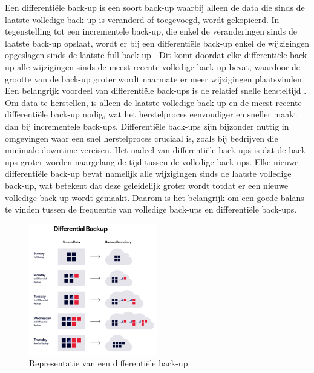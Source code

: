 Een differentiële back-up is een soort back-up waarbij alleen de data die sinds de laatste volledige back-up is veranderd of toegevoegd, wordt gekopieerd. In tegenstelling tot een incrementele back-up, die enkel de veranderingen sinds de laatste back-up opslaat, wordt er bij een differentiële back-up enkel de wijzigingen opgeslagen sinds de laatste full back-up . Dit komt doordat elke differentiële back-up alle wijzigingen sinds de meest recente volledige back-up bevat, waardoor de grootte van de back-up groter wordt naarmate er meer wijzigingen plaatsvinden. Een belangrijk voordeel van differentiële back-ups is de relatief snelle hersteltijd \autocite{Beard2018}. Om data te herstellen, is alleen de laatste volledige back-up en de meest recente differentiële back-up nodig, wat het herstelproces eenvoudiger en sneller maakt dan bij incrementele back-ups. Differentiële back-ups zijn bijzonder nuttig in omgevingen waar een snel herstelproces cruciaal is, zoals bij bedrijven die minimale downtime vereisen. Het nadeel van differentiële back-ups is dat de back-ups groter worden naargelang de tijd tussen de volledige back-ups. Elke nieuwe differentiële back-up bevat namelijk alle wijzigingen sinds de laatste volledige back-up, wat betekent dat deze geleidelijk groter wordt totdat er een nieuwe volledige back-up wordt gemaakt. Daarom is het belangrijk om een goede balans te vinden tussen de frequentie van volledige back-ups en differentiële back-ups.
 \begin{figure}[h]
     \centering
     \includegraphics[width=0.5\textwidth]{img/diff.png}  
     \caption{Representatie van een differentiële back-up \autocite{Rivas2022}}   
     \label{fig:diffrback-up}           
 \end{figure}

